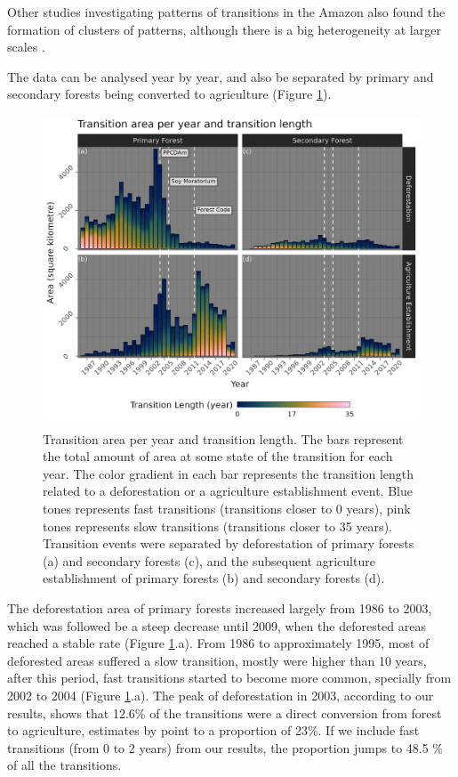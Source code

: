 \documentclass[essd, manuscript]{copernicus}
\begin{document}
Other studies investigating patterns of transitions in the Amazon also found the formation of clusters of patterns, although there is a big heterogeneity at larger scales \citep{MullerHansen2017}.

The data can be analysed year by year, and also be separated by primary and secondary forests being converted to agriculture (Figure \ref{fig:transbar-plot}).

\begin{figure}[ht]
\includegraphics[width=17cm]{figs/trans_length_cols} \caption{Transition area per year and transition length. The bars represent the total amount of area at some state of the transition for each year. The color gradient in each bar represents the transition length related to a deforestation or a agriculture establishment event. Blue tones represents fast transitions (transitions closer to 0 years), pink tones represents slow transitions (transitions closer to 35 years). Transition events were separated by deforestation of primary forests (a) and secondary forests (c), and the subsequent  agriculture establishment of primary forests (b) and secondary forests (d).}\label{fig:transbar-plot}
\end{figure}

The deforestation area of primary forests increased largely from 1986 to 2003, which was followed be a steep decrease until 2009, when the deforested areas reached a stable rate (Figure \ref{fig:transbar-plot}.a).
From 1986 to approximately 1995, most of deforested areas suffered a slow transition, mostly were higher than 10 years, after this period, fast transitions started to become more common, specially from 2002 to 2004 (Figure \ref{fig:transbar-plot}.a).
The peak of deforestation in 2003, according to our results, shows that 12.6\% of the transitions were a direct conversion from forest to agriculture, estimates by \citet{Morton2006} point to a proportion of 23\%.
If we include fast transitions (from 0 to 2 years) from our results, the proportion jumps to 48.5 \% of all the transitions.
\end{document}
